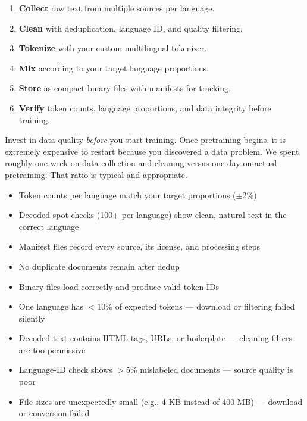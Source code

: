 \documentclass[11pt,a4paper]{article}
\begin{document}
\begin{enumerate}
    \item \textbf{Collect} raw text from multiple sources per language.
    \item \textbf{Clean} with deduplication, language ID, and quality filtering.
    \item \textbf{Tokenize} with your custom multilingual tokenizer.
    \item \textbf{Mix} according to your target language proportions.
    \item \textbf{Store} as compact binary files with manifests for tracking.
    \item \textbf{Verify} token counts, language proportions, and data integrity before training.
\end{enumerate}

\begin{tip}
Invest in data quality \emph{before} you start training. Once pretraining begins, it is extremely expensive to restart because you discovered a data problem. We spent roughly one week on data collection and cleaning versus one day on actual pretraining. That ratio is typical and appropriate.
\end{tip}

\begin{successcheck}
\begin{itemize}[nosep]
  \item Token counts per language match your target proportions ($\pm$2\%)
  \item Decoded spot-checks (100+ per language) show clean, natural text in the correct language
  \item Manifest files record every source, its license, and processing steps
  \item No duplicate documents remain after dedup
  \item Binary files load correctly and produce valid token IDs
\end{itemize}
\end{successcheck}

\begin{failuresign}
\begin{itemize}[nosep]
  \item One language has $<$10\% of expected tokens --- download or filtering failed silently
  \item Decoded text contains HTML tags, URLs, or boilerplate --- cleaning filters are too permissive
  \item Language-ID check shows $>$5\% mislabeled documents --- source quality is poor
  \item File sizes are unexpectedly small (e.g., 4 KB instead of 400 MB) --- download or conversion failed
\end{itemize}
\end{failuresign}
\end{document}
